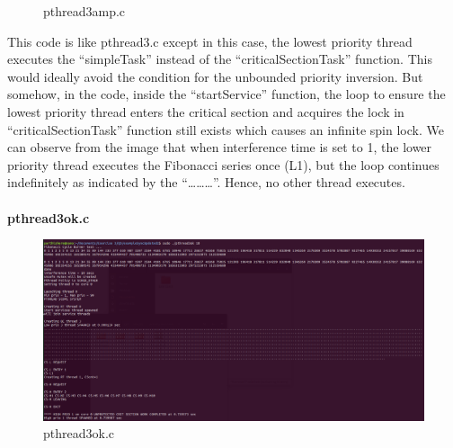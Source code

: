 \documentclass[a4paper,11pt]{article}%
\newenvironment{qanda}{\setlength{\parindent}{0pt}}{\bigskip}
\begin{document}
\begin{qanda}
\begin{enumerate}
\begin{enumerate}
\begin{enumerate}
\begin{figure}[H]
									\caption{pthread3amp.c}
								\end{figure}
					            This code is like pthread3.c except in this case, the lowest priority thread executes the “simpleTask” instead of the “criticalSectionTask” function. This would ideally avoid the condition for the unbounded priority inversion. But somehow, in the code, inside the “startService” function, the loop to ensure the lowest priority thread enters the critical section and acquires the lock in “criticalSectionTask” function still exists which causes an infinite spin lock. We can observe from the image that when interference time is set to 1, the lower priority thread executes the Fibonacci series once (L1), but the loop continues indefinitely as indicated by the “………”. Hence, no other thread executes.\\\\
					            \textbf{pthread3ok.c}
								\begin{figure}[H]
									\centering
									\includegraphics[scale=0.6]{figures/pthread3ok.png}
									\caption{pthread3ok.c}
								\end{figure}


\end{enumerate}
\end{enumerate}
\end{enumerate}
\end{qanda}
\end{document}
